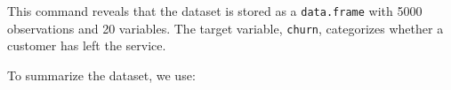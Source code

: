 \documentclass[
  11pt,
]{book}
\makeatletter
\newenvironment{Shaded}{}{}
\newcommand{\DecValTok}[1]{#1}
\newcommand{\NormalTok}[1]{#1}
\newcommand{\SpecialCharTok}[1]{\textcolor[rgb]{0.39,0.39,0.39}{#1}}
\newcommand{\StringTok}[1]{\textcolor[rgb]{0.39,0.39,0.39}{#1}}
\newenvironment{kframe}{%
\medskip{}
\setlength{\fboxsep}{.8em}
 \def\at@end@of@kframe{}%
 \ifinner\ifhmode%
  \def\at@end@of@kframe{\end{minipage}}%
  \begin{minipage}{\columnwidth}%
 \fi\fi%
 \def\FrameCommand##1{\hskip\@totalleftmargin \hskip-\fboxsep
 \colorbox{shadecolor}{##1}\hskip-\fboxsep
     \hskip-\linewidth \hskip-\@totalleftmargin \hskip\columnwidth}%
 \MakeFramed {\advance\hsize-\width
   \@totalleftmargin\z@ \linewidth\hsize
   \@setminipage}}%
 {\par\unskip\endMakeFramed%
 \at@end@of@kframe}
\renewenvironment{Shaded}{\begin{kframe}}{\end{kframe}}
\theoremstyle{definition}
\theoremstyle{definition}
\theoremstyle{definition}
\theoremstyle{definition}
\theoremstyle{remark}
\makeatother
\begin{document}
\begin{Shaded}
\end{Shaded}

This command reveals that the dataset is stored as a \texttt{data.frame} with 5000 observations and 20 variables. The target variable, \texttt{churn}, categorizes whether a customer has left the service.

To summarize the dataset, we use:
\end{document}
